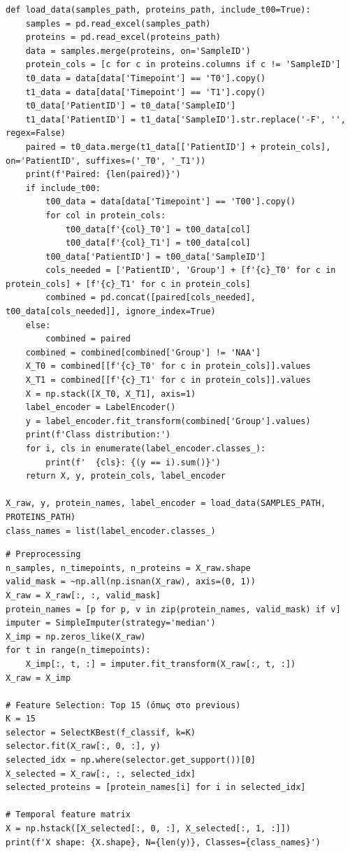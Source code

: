 \begin{lstlisting}
def load_data(samples_path, proteins_path, include_t00=True):
    samples = pd.read_excel(samples_path)
    proteins = pd.read_excel(proteins_path)
    data = samples.merge(proteins, on='SampleID')
    protein_cols = [c for c in proteins.columns if c != 'SampleID']
    t0_data = data[data['Timepoint'] == 'T0'].copy()
    t1_data = data[data['Timepoint'] == 'T1'].copy()
    t0_data['PatientID'] = t0_data['SampleID']
    t1_data['PatientID'] = t1_data['SampleID'].str.replace('-F', '', regex=False)
    paired = t0_data.merge(t1_data[['PatientID'] + protein_cols], on='PatientID', suffixes=('_T0', '_T1'))
    print(f'Paired: {len(paired)}')
    if include_t00:
        t00_data = data[data['Timepoint'] == 'T00'].copy()
        for col in protein_cols:
            t00_data[f'{col}_T0'] = t00_data[col]
            t00_data[f'{col}_T1'] = t00_data[col]
        t00_data['PatientID'] = t00_data['SampleID']
        cols_needed = ['PatientID', 'Group'] + [f'{c}_T0' for c in protein_cols] + [f'{c}_T1' for c in protein_cols]
        combined = pd.concat([paired[cols_needed], t00_data[cols_needed]], ignore_index=True)
    else:
        combined = paired
    combined = combined[combined['Group'] != 'NAA']
    X_T0 = combined[[f'{c}_T0' for c in protein_cols]].values
    X_T1 = combined[[f'{c}_T1' for c in protein_cols]].values
    X = np.stack([X_T0, X_T1], axis=1)
    label_encoder = LabelEncoder()
    y = label_encoder.fit_transform(combined['Group'].values)
    print(f'Class distribution:')
    for i, cls in enumerate(label_encoder.classes_):
        print(f'  {cls}: {(y == i).sum()}')
    return X, y, protein_cols, label_encoder
 
X_raw, y, protein_names, label_encoder = load_data(SAMPLES_PATH, PROTEINS_PATH)
class_names = list(label_encoder.classes_)
\end{lstlisting}
 
\begin{lstlisting}
# Preprocessing
n_samples, n_timepoints, n_proteins = X_raw.shape
valid_mask = ~np.all(np.isnan(X_raw), axis=(0, 1))
X_raw = X_raw[:, :, valid_mask]
protein_names = [p for p, v in zip(protein_names, valid_mask) if v]
imputer = SimpleImputer(strategy='median')
X_imp = np.zeros_like(X_raw)
for t in range(n_timepoints):
    X_imp[:, t, :] = imputer.fit_transform(X_raw[:, t, :])
X_raw = X_imp
 
# Feature Selection: Top 15 (όπως στο previous)
K = 15
selector = SelectKBest(f_classif, k=K)
selector.fit(X_raw[:, 0, :], y)
selected_idx = np.where(selector.get_support())[0]
X_selected = X_raw[:, :, selected_idx]
selected_proteins = [protein_names[i] for i in selected_idx]
 
# Temporal feature matrix
X = np.hstack([X_selected[:, 0, :], X_selected[:, 1, :]])
print(f'X shape: {X.shape}, N={len(y)}, Classes={class_names}')
\end{lstlisting}
 
